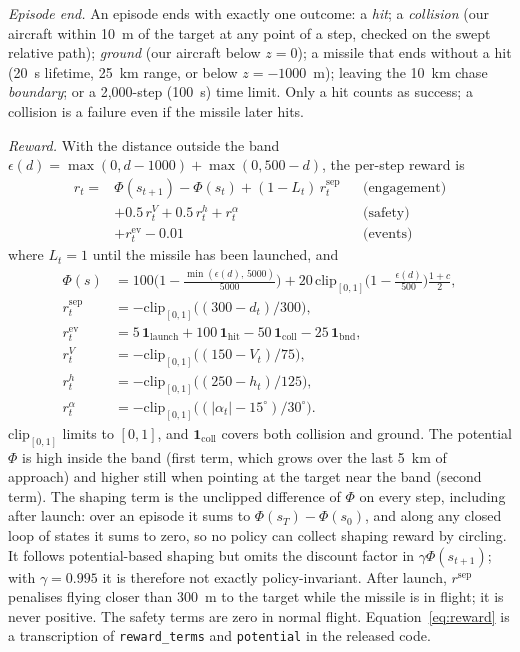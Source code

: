 \documentclass[conference]{IEEEtran}
\newcommand{\ind}{\mathbf{1}}
\begin{document}
\emph{Episode end.} An episode ends with exactly one outcome: a \emph{hit}; a \emph{collision} (our aircraft within 10~m of the target at any point of a step, checked on the swept relative path); \emph{ground} (our aircraft below $z=0$); a missile that ends without a hit (20~s lifetime, 25~km range, or below $z=-1000$~m); leaving the 10~km chase \emph{boundary}; or a 2,000-step (100~s) time limit. Only a hit counts as success; a collision is a failure even if the missile later hits.

\emph{Reward.} With the distance outside the band $\epsilon(d)=\max(0,d-1000)+\max(0,500-d)$, the per-step reward is
\begin{equation}
\begin{aligned}
r_t ={}& \Phi(s_{t+1})-\Phi(s_t) + (1-L_t)\,r^{\mathrm{sep}}_{t} && \text{(engagement)}\\
&+ 0.5\,r^{V}_t + 0.5\,r^{h}_t + r^{\alpha}_t && \text{(safety)}\\
&+ r^{\mathrm{ev}}_t - 0.01 && \text{(events)}
\end{aligned}
\label{eq:reward}
\end{equation}
where $L_t=1$ until the missile has been launched, and
\begin{align*}
\Phi(s) &= 100\Big(1-\tfrac{\min(\epsilon(d),\,5000)}{5000}\Big) + 20\,\mathrm{clip}_{[0,1]}\Big(1-\tfrac{\epsilon(d)}{500}\Big)\tfrac{1+c}{2},\\
r^{\mathrm{sep}}_t &= -\mathrm{clip}_{[0,1]}\big((300-d_t)/300\big),\\
r^{\mathrm{ev}}_t &= 5\,\ind_{\mathrm{launch}} + 100\,\ind_{\mathrm{hit}} - 50\,\ind_{\mathrm{coll}} - 25\,\ind_{\mathrm{bnd}},\\
r^{V}_t &= -\mathrm{clip}_{[0,1]}\big((150-V_t)/75\big),\\
r^{h}_t &= -\mathrm{clip}_{[0,1]}\big((250-h_t)/125\big),\\
r^{\alpha}_t &= -\mathrm{clip}_{[0,1]}\big((|\alpha_t|-15^\circ)/30^\circ\big).
\end{align*}
$\mathrm{clip}_{[0,1]}$ limits to $[0,1]$, and $\ind_{\mathrm{coll}}$ covers both collision and ground. The potential $\Phi$ is high inside the band (first term, which grows over the last 5~km of approach) and higher still when pointing at the target near the band (second term). The shaping term is the unclipped difference of $\Phi$ on every step, including after launch: over an episode it sums to $\Phi(s_T)-\Phi(s_0)$, and along any closed loop of states it sums to zero, so no policy can collect shaping reward by circling. It follows potential-based shaping \cite{ng1999shaping} but omits the discount factor in $\gamma\Phi(s_{t+1})$; with $\gamma=0.995$ it is therefore not exactly policy-invariant. After launch, $r^{\mathrm{sep}}$ penalises flying closer than 300~m to the target while the missile is in flight; it is never positive. The safety terms are zero in normal flight. Equation~\eqref{eq:reward} is a transcription of \texttt{reward\_terms} and \texttt{potential} in the released code.
\end{document}

